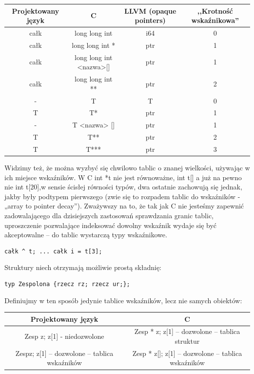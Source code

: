 \begin{center}
\begin{tabular}{|c|c|c|c|}
\hline
\textbf{Projektowany język} & \textbf{C} & \textbf{LLVM \tiny{(opaque pointers)}} & \textbf{,,Krotność wskaźnikowa''} \\ \hline
całk        & long long int             & i64 & 0 \\ \hline
całk\up     & long long int *           & ptr & 1 \\ \hline
całk\up     & long long int <nazwa>[]   & ptr & 1 \\ \hline
całk\up\up  & long long int **          & ptr & 2 \\ \hline
-           & T                         & T   & 0 \\ \hline
T           & T*                        & ptr & 1 \\ \hline
-           & T <nazwa> []              & ptr & 1 \\ \hline
T\up        & T**                       & ptr & 2 \\ \hline
T\up\up     & T***                      & ptr & 3 \\ \hline
\end{tabular}
\end{center}

Widzimy też, że można wyzbyć się chwilowo tablic o znanej wielkości, używając w ich miejsce wskaźników. W C int *t  nie jest równoważne, int t[] a już na pewno nie int t[20],w sensie ścisłej równości typów, dwa ostatnie zachowują się jednak, jakby były podtypem pierwszego (zwie się to rozpadem tablic do wskaźników - „array to pointer decay”). Zważywszy na to, że tak jak C nie jesteśmy zapewnić zadowalającego dla dzisiejszych zastosowań sprawdzania granic tablic, uproszczenie pozwalające indeksować dowolny wskaźnik wydaje się być akceptowalne – do tablic wystarczą typy wskaźnikowe.
\begin{lstlisting}
całk ^ t; ... całk i = t[3];
\end{lstlisting}

Struktury niech otrzymają możliwie prostą składnię:
\begin{lstlisting}
typ Zespolona {rzecz rz; rzecz ur;};
\end{lstlisting}
Definiujmy w ten sposób jedynie tablice wskaźników, lecz nie samych obiektów:
\begin{center}
\begin{tabular}{|c|c|}
\hline
\textbf{Projektowany język} &  \textbf{C} \\ \hline
Zesp z; z[1] - niedozwolone & Zesp * z; z[1] – dozwolone – tablica struktur \\ \hline
Zesp\up \space z; z[1] – dozwolone – tablica wskaźników & Zesp * z[]; z[1] – dozwolone – tablica wskaźników \\ \hline
\end{tabular}
\end{center}

